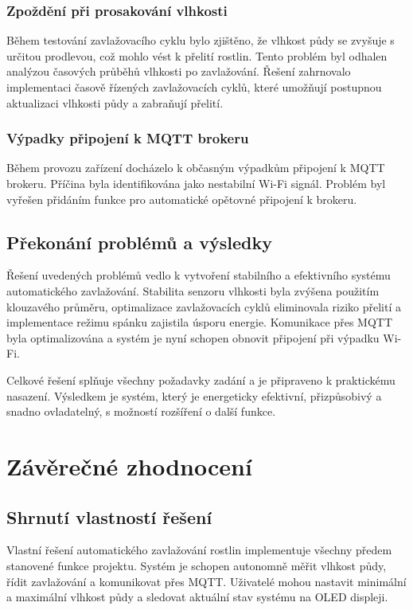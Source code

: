 \documentclass[a4paper, 11pt]{article}
\begin{document}
\subsubsection{Zpoždění při prosakování vlhkosti}
Během testování zavlažovacího cyklu bylo zjištěno, že vlhkost půdy se zvyšuje s určitou prodlevou, což mohlo vést k přelití rostlin. 
Tento problém byl odhalen analýzou časových průběhů vlhkosti po zavlažování. Řešení zahrnovalo implementaci časově řízených zavlažovacích cyklů, 
které umožňují postupnou aktualizaci vlhkosti půdy a zabraňují přelití.

\subsubsection{Výpadky připojení k MQTT brokeru}
Během provozu zařízení docházelo k občasným výpadkům připojení k MQTT brokeru. Příčina byla identifikována jako nestabilní Wi-Fi signál. 
Problém byl vyřešen přidáním funkce pro automatické opětovné připojení k brokeru.

\subsection{Překonání problémů a výsledky}

Řešení uvedených problémů vedlo k vytvoření stabilního a efektivního systému automatického zavlažování. 
Stabilita senzoru vlhkosti byla zvýšena použitím klouzavého průměru, optimalizace zavlažovacích cyklů eliminovala riziko přelití
a implementace režimu spánku zajistila úsporu energie. Komunikace přes MQTT byla optimalizována a systém je nyní schopen obnovit připojení při výpadku Wi-Fi.

Celkové řešení splňuje všechny požadavky zadání a je připraveno k praktickému nasazení. Výsledkem je systém, který je energeticky efektivní, 
přizpůsobivý a snadno ovladatelný, s možností rozšíření o další funkce.

\section{Závěrečné zhodnocení}

\subsection{Shrnutí vlastností řešení}

Vlastní řešení automatického zavlažování rostlin implementuje všechny předem stanovené funkce projektu. 
Systém je schopen autonomně měřit vlhkost půdy, řídit zavlažování a komunikovat přes MQTT. 
Uživatelé mohou nastavit minimální a maximální vlhkost půdy a sledovat aktuální stav systému na OLED displeji.
\end{document}
